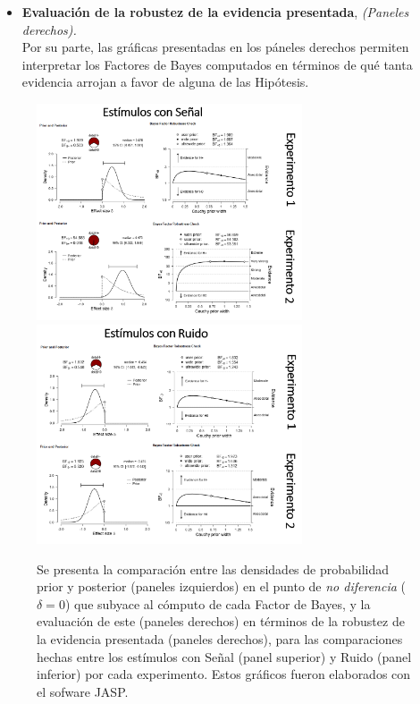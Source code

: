 \begin{itemize}
\item \textbf{Evaluación de la robustez de la evidencia presentada}, \textit{(Paneles derechos).}\\

Por su parte, las gráficas presentadas en los páneles derechos permiten interpretar los Factores de Bayes computados en términos de qué tanta evidencia arrojan a favor de alguna de las Hipótesis.\\

\end{itemize}

\begin{figure}[th]
\centering
\includegraphics[width=0.7\textwidth]{Figures/JASP_Tbayesian_Signals}\\ 
\includegraphics[width=0.7\textwidth]{Figures/JASP_Tbayesian_Noise}\\ 
\caption[Diferencias entre las Tasas de Hits y Falsas Alarmas registradas en cada clase de estímulos]{Se presenta la comparación entre las densidades de probabilidad prior y posterior (paneles izquierdos) en el punto de \textit{no diferencia} ($\delta = 0$) que subyace al cómputo de cada Factor de Bayes, y la evaluación de este (paneles derechos) en términos de la robustez de la evidencia presentada (paneles derechos), para las comparaciones hechas entre los estímulos con Señal (panel superior) y Ruido (panel inferior) por cada experimento. Estos gráficos fueron elaborados con el sofware JASP.}
\label{fig:JASP_Tbayesian}
\end{figure}

